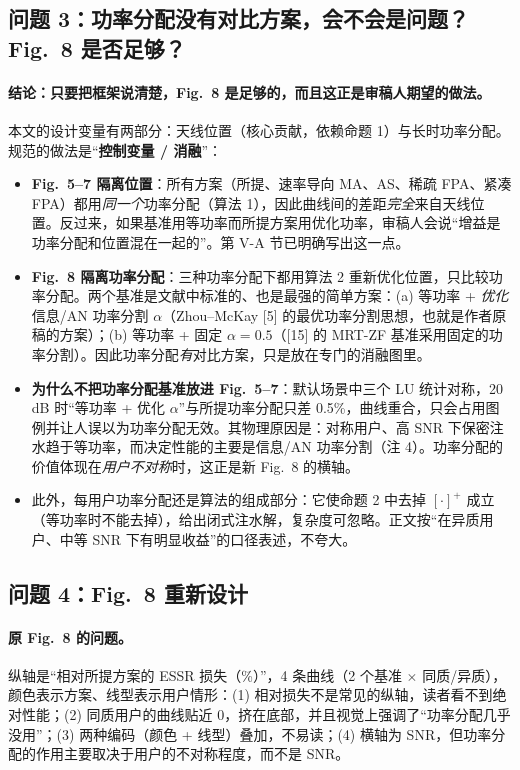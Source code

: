 \documentclass[11pt,a4paper]{ctexart}
\begin{document}
\subsection{问题 3：功率分配没有对比方案，会不会是问题？Fig.~8 是否足够？}
\paragraph{结论：只要把框架说清楚，Fig.~8 是足够的，而且这正是审稿人期望的做法。}
本文的设计变量有两部分：天线位置（核心贡献，依赖命题 1）与长时功率分配。规范的做法是“\textbf{控制变量 / 消融}”：
\begin{itemize}
\item \textbf{Fig.~5--7 隔离位置}：所有方案（所提、速率导向 MA、AS、稀疏 FPA、紧凑 FPA）都用\emph{同一个}功率分配（算法 1），因此曲线间的差距\emph{完全}来自天线位置。反过来，如果基准用等功率而所提方案用优化功率，审稿人会说“增益是功率分配和位置混在一起的”。第 V-A 节已明确写出这一点。
\item \textbf{Fig.~8 隔离功率分配}：三种功率分配下都用算法 2 重新优化位置，只比较功率分配。两个基准是文献中标准的、也是最强的简单方案：(a) 等功率 + \emph{优化}信息/AN 功率分割 $\alpha$（Zhou--McKay [5] 的最优功率分割思想，也就是作者原稿的方案）；(b) 等功率 + 固定 $\alpha=0.5$（[15] 的 MRT-ZF 基准采用固定的功率分割）。因此功率分配\emph{有}对比方案，只是放在专门的消融图里。
\item \textbf{为什么不把功率分配基准放进 Fig.~5--7}：默认场景中三个 LU 统计对称，20 dB 时“等功率 + 优化 $\alpha$”与所提功率分配只差 0.5\%，曲线重合，只会占用图例并让人误以为功率分配无效。其物理原因是：对称用户、高 SNR 下保密注水趋于等功率，而决定性能的主要是信息/AN 功率分割（注 4）。功率分配的价值体现在\emph{用户不对称}时，这正是新 Fig.~8 的横轴。
\item 此外，每用户功率分配还是算法的组成部分：它使命题 2 中去掉 $[\cdot]^+$ 成立（等功率时不能去掉），给出闭式注水解，复杂度可忽略。正文按“在异质用户、中等 SNR 下有明显收益”的口径表述，不夸大。
\end{itemize}

\subsection{问题 4：Fig.~8 重新设计}
\paragraph{原 Fig.~8 的问题。}纵轴是“相对所提方案的 ESSR 损失（\%）”，4 条曲线（2 个基准 $\times$ 同质/异质），颜色表示方案、线型表示用户情形：(1) 相对损失不是常见的纵轴，读者看不到绝对性能；(2) 同质用户的曲线贴近 0，挤在底部，并且视觉上强调了“功率分配几乎没用”；(3) 两种编码（颜色 + 线型）叠加，不易读；(4) 横轴为 SNR，但功率分配的作用主要取决于用户的不对称程度，而不是 SNR。
\end{document}
